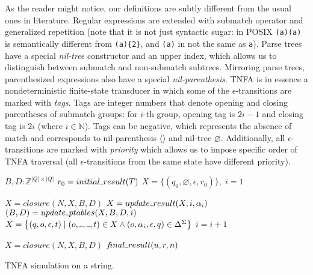 \documentclass[AMA,STIX1COL]{WileyNJD-v2}
\newcommand{\Xm}{\langle\!\rangle}
\newcommand{\Xund}{\rule{.4em}{.4pt}}
\newcommand{\YN}{\mathbb{N}}
\newcommand{\YZ}{\mathbb{Z}}
\begin{document}
As the reader might notice, our definitions are subtly different from the usual ones in literature.
Regular expressions are extended with submatch operator
and generalized repetition (note that it is not just syntactic sugar: in POSIX \texttt{(a)(a)} is semantically different from \texttt{(a)\{2\}},
and \texttt{(a)} in not the same as \texttt{a}).
Parse trees have a special \emph{nil-tree} constructor
and an upper index, which allows us to distinguish between submatch and non-submatch subtrees.
Mirroring parse trees, parenthesized expressions also have a special \emph{nil-parenthesis}.
TNFA is in essence a nondeterministic finite-state transducer
in which some of the $\epsilon$-transitions are marked with \emph{tags}.
Tags are integer numbers that denote opening and closing parentheses of submatch groups:
for $i$-th group, opening tag is $2i - 1$ and closing tag is $2i$ (where $i \in \YN$).
Tags can be negative, which represents the absence of match and corresponds to nil-parenthesis $\Xm$ and nil-tree $\varnothing$.
Additionally, all $\epsilon$-transitions are marked with \emph{priority}
which allows us to impose specific order of TNFA traversal
(all $\epsilon$-transitions from the same state have different priority).
\\

\begin{algorithm}[H] \DontPrintSemicolon {} 
 {

    $B, D : \YZ^{|Q| \times |Q|}$ \;
    $r_0 = initial \Xund result(T)$ \;
    $X = \big\{ (q_0, \varnothing, \epsilon, r_0) \big\}, \; i = 1$ \;

    \BlankLine
     {
        $X = closure(N, X, B, D)$ \;
        $X = update \Xund result(X, i, \alpha_i)$ \;
        $(B, D) = update \Xund ptables(X, B, D, i)$ \;
        $X = \big\{ (q, o, \epsilon, t) \mid (o, \Xund, \Xund, t) \in X \wedge (o, \alpha_i, \epsilon, q) \in \Delta^\Sigma \big\}$ \;
        $i = i + 1$ \;
    }

    \BlankLine
    $X = closure(N, X, B, D)$ \;
    \If {$(q_f, \Xund, u, r) \in X$} {
        \Return $f\!inal \Xund result (u, r, n)$
    } \lElse {
        \Return $\varnothing$
    }
}
\caption{TNFA simulation on a string.}
\end{algorithm}
\medskip
\end{document}
